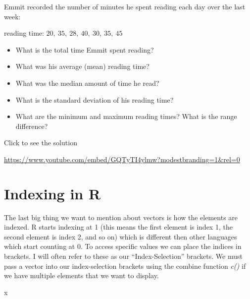 \documentclass[
  letterpaper,
  DIV=11,
  numbers=noendperiod]{scrreprt}
\newenvironment{Shaded}{\begin{snugshade}}{\end{snugshade}}
\newcommand{\NormalTok}[1]{\textcolor[rgb]{0.00,0.23,0.31}{#1}}
\providecommand{\tightlist}{%
  \setlength{\itemsep}{0pt}\setlength{\parskip}{0pt}}
\begin{document}
\begin{tcolorbox}[enhanced jigsaw, colframe=quarto-callout-tip-color-frame, colback=white, breakable, rightrule=.15mm, title=\textcolor{quarto-callout-tip-color}{\faLightbulb}\hspace{0.5em}{Try it Out}, bottomtitle=1mm, toptitle=1mm, titlerule=0mm, left=2mm, coltitle=black, colbacktitle=quarto-callout-tip-color!10!white, leftrule=.75mm, opacitybacktitle=0.6, bottomrule=.15mm, opacityback=0, arc=.35mm, toprule=.15mm]

Emmit recorded the number of minutes he spent reading each day over the
last week:

reading time: \(20,\ 35,\ 28,\ 40,\ 30,\ 35,\ 45\)

\begin{itemize}
\tightlist
\item
  What is the total time Emmit spent reading?
\item
  What was his average (mean) reading time?
\item
  What was the median amount of time he read?
\item
  What is the standard deviation of his reading time?
\item
  What are the minimum and maximum reading times? What is the range
  difference?
\end{itemize}

Click to see the solution

\url{https://www.youtube.com/embed/GQTyTI4ylmw?modestbranding=1&rel=0}

\end{tcolorbox}

\section{Indexing in R}\label{indexing-in-r}

The last big thing we want to mention about vectors is how the elements
are indexed. R starts indexing at 1 (this means the first element is
index 1, the second element is index 2, and so on) which is different
then other languages which start counting at 0. To access specific
values we can place the indices in brackets. I will often refer to these
as our ``Index-Selection'' brackets. We must pass a vector into our
index-selection brackets using the combine function \emph{c()} if we
have multiple elements that we want to display.

\begin{Shaded}
\begin{Highlighting}[]
\NormalTok{x}
\end{Highlighting}
\end{Shaded}
\end{document}

